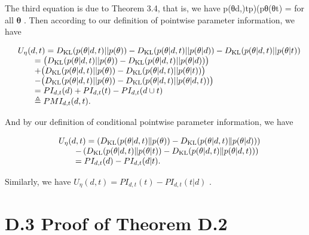 The third equation is due to Theorem 3.4, that is, we have
p(θ\textbar d,)tp)(pθ(\textbar θt) = for all \(\pmb \theta\) . Then
according to our definition of pointwise parameter information, we have

\[
\begin{array} { r l } & { U _ { \eta } ( d , t ) = D _ { \mathrm { K L } } ( p ( \theta | d , t ) | | p ( \theta ) ) - D _ { \mathrm { K L } } ( p ( \theta | d , t ) | | p ( \theta | d ) ) - D _ { \mathrm { K L } } ( p ( \theta | d , t ) | | p ( \theta | t ) ) } \\ & { \quad \quad = \big ( D _ { \mathrm { K L } } ( p ( \theta | d , t ) | | p ( \theta ) ) - D _ { \mathrm { K L } } ( p ( \theta | d , t ) | | p ( \theta | d ) ) \big ) } \\ & { \qquad + \big ( D _ { \mathrm { K L } } ( p ( \theta | d , t ) | | p ( \theta ) ) - D _ { \mathrm { K L } } ( p ( \theta | d , t ) | | p ( \theta | t ) ) \big ) } \\ & { \qquad - \big ( D _ { \mathrm { K L } } ( p ( \theta | d , t ) | | p ( \theta ) ) - D _ { \mathrm { K L } } ( p ( \theta | d , t ) | | p ( \theta | d , t ) ) \big ) } \\ & { \quad \quad = P I _ { d , t } ( d ) + P I _ { d , t } ( t ) - P I _ { d , t } ( d \cup t ) } \\ & { \quad \quad \triangleq P M I _ { d , t } ( d , t ) . } \end{array}
\]

And by our definition of conditional pointwise parameter information, we
have

\[
\begin{array} { r l } & { U _ { \eta } ( d , t ) = \left( D _ { \mathrm { K L } } ( p ( \theta | d , t ) \| p ( \theta ) ) - D _ { \mathrm { K L } } ( p ( \theta | d , t ) \| p ( \theta | d ) ) \right) } \\ & { \qquad - \left( D _ { \mathrm { K L } } ( p ( \theta | d , t ) \| p ( \theta | t ) ) - D _ { \mathrm { K L } } ( p ( \theta | d , t ) \| p ( \theta | d , t ) ) \right) } \\ & { \qquad = P I _ { d , t } ( d ) - P I _ { d , t } ( d | t ) . } \end{array}
\]

Similarly, we have
\(U _ { \eta } ( d , t ) = P I _ { d , t } ( t ) - P I _ { d , t } ( t | d )\)
.

\section{D.3 Proof of Theorem D.2}\label{d.3-proof-of-theorem-d.2}

